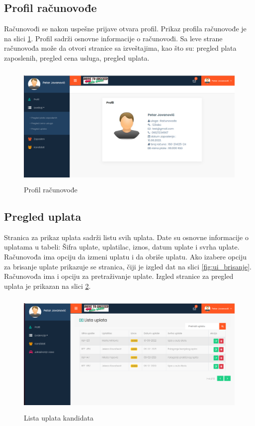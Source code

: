 \subsection{Profil računovođe}

Računovođi se nakon uspešne prijave otvara profil. Prikaz profila računovođe je na slici \ref{fig:profilR}. 
Profil sadrži osnovne informacije o računovođi. Sa leve strane računovođa može da otvori stranice sa izveštajima, kao što su: pregled plata zaposlenih, pregled cena usluga, pregled uplata. 

\begin{figure}[H]
  \begin{center}
      \includegraphics[width=140mm, height=60mm]{UI/UI_profil_racunovodja.png}
  \end{center}
  \caption {Profil računovođe}
  \label{fig:profilR}

\end{figure}

\subsection{Pregled uplata}

Stranica za prikaz uplata sadrži listu svih uplata. Date su osnovne informacije o uplatama u tabeli: Šifra uplate, uplatilac, iznos, datum uplate i svrha uplate.
  Računovođa ima opciju da izmeni uplatu i da obriše uplatu. Ako izabere opciju za brisanje uplate prikazuje se stranica, čiji je izgled dat na slici \ref{fig:ui_brisanje}. Računovođa ima i opciju za pretraživanje uplate. Izgled stranice za pregled uplata je prikazan na slici 
\ref{fig:ui_uplate}.

\begin{figure}[H]
  \begin{center}
      \includegraphics[width=140mm, height=60mm]{UI/UI_lista_uplata.png}
  \end{center}
  \caption {Lista uplata kandidata}
  \label{fig:ui_uplate}

\end{figure}



